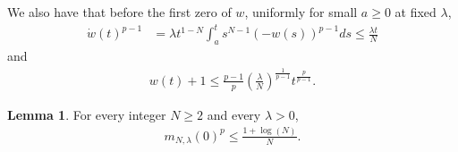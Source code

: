 \documentclass[11pt]{amsart}
\theoremstyle{definition}
\newtheorem{lemma}[theorem]{Lemma}
\begin{document}
We also have that before the first zero of $w$, uniformly for small $a\geq 0$ at fixed $\lambda$,
\begin{align*}
    \dot{w}(t)^{p-1}&=\lambda t^{1-N}\int_a^ts^{N-1}(-w(s))^{p-1}ds \leq \frac{\lambda t}{N}
\end{align*}
and
\begin{align*}
    w(t)+1\leq \frac{p-1}{p}\left(\frac{\lambda}{N}\right)^{\frac{1}{p-1}}t^{\frac{p}{p-1}}.
\end{align*}

\begin{lemma}
    For every integer $N\geq 2$ and every $\lambda >0$,
    \begin{align*}
        m_{N,\lambda}(0)^p\leq \frac{1+\log(N)}{N}.
    \end{align*}
\end{lemma}
\end{document}
